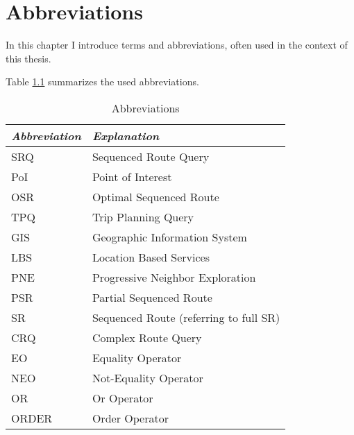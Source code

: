 \chapter{Abbreviations}
In this chapter I introduce terms and abbreviations, often used in the context of this thesis.

Table \ref{abbr} summarizes the used abbreviations.

\begin{table}[h!]
	\centering
	\begin{tabular}{ |l|l| } 
		\hline
		\textit{Abbreviation} & \textit{Explanation} \\
		\hline
		SRQ & Sequenced Route Query \\ 

		PoI & Point of Interest \\ 

		OSR & Optimal Sequenced Route \\
		
		TPQ & Trip Planning Query \\
		
		GIS & Geographic Information System \\
		
		LBS & Location Based Services \\

		PNE & Progressive Neighbor Exploration \cite{OSR} \\ 

		PSR & Partial Sequenced Route \\ 

		SR & Sequenced Route (referring to full SR)\\
		
		CRQ & Complex Route Query \\
		
		EO & Equality Operator \\
		
		NEO & Not-Equality Operator \\
		
		OR & Or Operator \\
		
		ORDER & Order Operator \\
		\hline
	\end{tabular}
	\caption{Abbreviations}
	\label{abbr}
\end{table}
